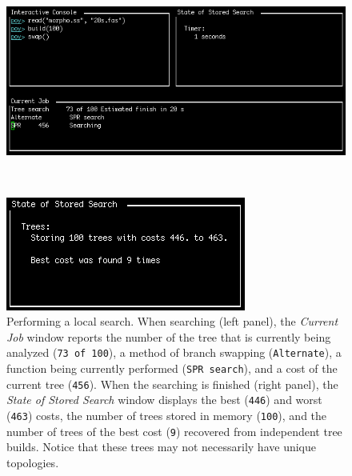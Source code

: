 {\begin{figure}
\centering
\begin{minipage}[c]{0.49\textwidth}
\includegraphics[width=\textwidth]{doc/figures/swap1.jpg}
\end{minipage}
\,
\begin{minipage}[c]{0.453\textwidth}
\includegraphics[width=\textwidth]{doc/figures/swap2.jpg}
\end{minipage}
\caption{Performing a local search. When searching (left panel), the \emph{Current Job} window reports the number 
of the tree that is currently being analyzed (\texttt{73 of 100}), a method of branch swapping (\texttt{Alternate}), a 
function being currently performed (\texttt{SPR search}), and a cost of the current tree (\texttt{456}). When the 
searching is finished (right panel), the \emph{State of Stored Search} window displays the best (\texttt{446}) and 
worst (\texttt{463}) costs, the number of trees stored in memory (\texttt{100}), and the number of trees of the best 
cost (\texttt{9}) recovered from independent tree builds. Notice that these trees may not necessarily have unique topologies.} 
\label{fig:swapping}
\end{figure}

}
